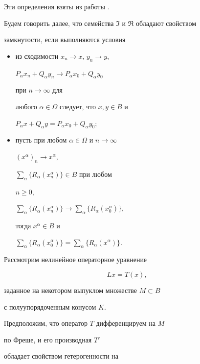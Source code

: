 Эти определения взяты из работы \cite{Op1}.





Будем говорить далее, что семейства $\Im$ и $\Re$ обладают свойством


замкнутости, если выполняются условия


\begin{itemize}


\item[1)] из сходимости $x_n\to x$, $y_n\to y$,


$P_\alpha x_n+Q_\alpha y_n\to P_\alpha x_0+Q_\alpha y_0$


при $n\to\infty$ для


любого $\alpha\in \Omega$ следует, что $x,y\in B$ и


$P_\alpha x+Q_\alpha y=P_\alpha x_0+Q_\alpha y_0$;


\item[2)] пусть при любом $\alpha\in\Omega$ и $n\to\infty$\;


$(x^\alpha)_n\to x^\alpha$,


$\sum\limits_\alpha\{R_\alpha(x^\alpha_n)\}\in B$ при любом


$n\ge 0$,


$\sum\limits_\alpha\{R_\alpha(x^\alpha_n)\}\to


\sum\limits_\alpha\{R_\alpha(x^\alpha_0)\}$,


тогда $x^\alpha\in B$ и


$\sum\limits_\alpha\{R_\alpha(x^\alpha_0)\}=


\sum\limits_\alpha\{R_\alpha(x^\alpha)\}$.


\end{itemize}





Рассмотрим нелинейное операторное уравнение


\begin{equation}


Lx=T(x),


\end{equation}


заданное на некотором выпуклом множестве $M\subset B$


с полуупорядоченным конусом $K$.


Предположим, что оператор $T$ дифференцируем на $M$


по Фреше, и его производная $T'$


обладает свойством гетерогенности на


